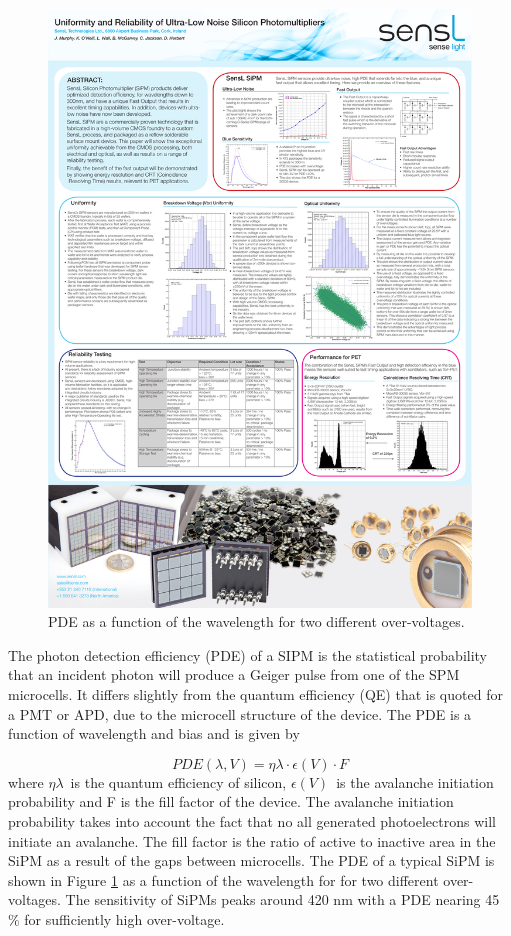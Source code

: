 \begin{figure}[!bhtp]
	\centering
	\includegraphics[scale=0.9]{img/SiPMPDE2.pdf}
	
	\caption{\label{fig.pde} PDE as a function of the wavelength for two different over-voltages.}
\end{figure}

The photon detection efficiency (PDE) of a SIPM is the statistical probability that an incident photon will produce a Geiger pulse from one of the SPM microcells. It differs slightly from the quantum efficiency (QE) that is quoted for a PMT or APD, due to the microcell structure of the device. The PDE is a function of wavelength and bias and is given by

\begin{equation}
PDE(\lambda, V) = \eta{\lambda} \cdot \epsilon(V) \cdot F
\end{equation}
%
where $ \eta{\lambda}$~is the quantum efficiency of silicon, $\epsilon(V)$~is the avalanche initiation probability and F is the fill factor of the device. The avalanche initiation probability takes into account the fact that no all generated photoelectrons will initiate an avalanche. The fill factor is the ratio of active to inactive area in the SiPM as a result of the gaps between microcells. The PDE of a typical SiPM is shown in Figure \ref{fig.pde} as a function of the wavelength for for two different over-voltages. The sensitivity of SiPMs peaks around 420 nm with a PDE nearing 45 \% for sufficiently high over-voltage. 

